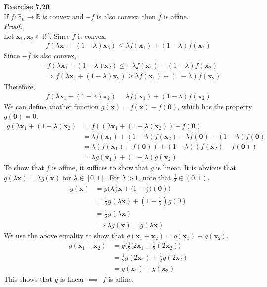 \documentclass[letterpaper,12pt]{article}
\let\vec\mathbf
\theoremstyle{definition}
\begin{document}
\textbf{Exercise 7.20} \\
If $f: \mathbb{R}_n \to \mathbb{R}$ is convex and $-f$ is also convex, then $f$ is affine.\\
\textit{Proof:} \\
Let $\vec{x}_1, \vec{x}_2 \in \mathbb{R}^n$.
Since $f$ is convex,
\begin{align*}
  f(\lambda \vec{x}_1 + (1-\lambda)\vec{x}_2) \leq \lambda f(\vec{x}_1) + (1-\lambda)f(\vec{x}_2)
\end{align*}
Since $-f$ is also convex,
\begin{align*}
  &-f(\lambda \vec{x}_1 + (1-\lambda)\vec{x}_2) \leq -\lambda f(\vec{x}_1) - (1-\lambda)f(\vec{x}_2)
  \\
  &\implies f(\lambda \vec{x}_1 + (1-\lambda)\vec{x}_2) \geq \lambda f(\vec{x}_1) + (1-\lambda)f(\vec{x}_2)
\end{align*}
Therefore,
\begin{align*}
  f(\lambda \vec{x}_1 + (1-\lambda)\vec{x}_2) = \lambda f(\vec{x}_1) + (1-\lambda)f(\vec{x}_2)
\end{align*}
We can define another function $g(\vec{x}) = f(\vec{x}) - f(\vec{0})$, which has the property $g(\vec{0})=0$.
\begin{align*}
  g(\lambda \vec{x}_1 + (1-\lambda)\vec{x}_2) &= f((\lambda \vec{x}_1 + (1-\lambda)\vec{x}_2)) - f(\vec{0})
  \\
  &= \lambda f(\vec{x}_1) + (1-\lambda)f(\vec{x}_2) - \lambda f(\vec{0}) - (1 - \lambda) f(\vec{0})
  \\
  &= \lambda (f(\vec{x}_1) - f(\vec{0})) + (1-\lambda)(f(\vec{x}_2) - f(\vec{0}))
  \\
  &= \lambda g(\vec{x}_1) + (1-\lambda)g(\vec{x}_2)
\end{align*}
To show that $f$ is affine, it suffices to show that $g$ is linear. It is obvious that $g(\lambda \vec{x}) = \lambda g(\vec{x})$ for $\lambda \in [0, 1]$. For $\lambda > 1$, note that $\frac{1}{\lambda} \in (0, 1)$.
\begin{align*}
  g(\vec{x})
  &= g\Big(\lambda \frac{1}{\lambda} \vec{x} + \Big(1-\frac{1}{\lambda}\Big)(\vec{0})\Big)
  \\
  &= \frac{1}{\lambda} g(\lambda \vec{x}) + (1-\frac{1}{\lambda})g(\vec{0})
  \\
  &= \frac{1}{\lambda} g(\lambda \vec{x})
\end{align*}
\begin{align*}
  \implies \lambda g(\vec{x}) = g(\lambda \vec{x})
\end{align*}
We use the above equality to show that $g(\vec{x}_1 + \vec{x}_2) = g(\vec{x}_1) + g(\vec{x}_2)$.
\begin{align*}
  g(\vec{x}_1 + \vec{x}_2)
  &= g\Big(\frac{1}{2}(2\vec{x}_1 + \frac{1}{2}(2\vec{x}_2)\Big) \\
  &= \frac{1}{2}g(2\vec{x}_1) + \frac{1}{2}g(2\vec{x}_2) \\
  &= g(\vec{x}_1) + g(\vec{x}_2)
\end{align*}
This shows that $g$ is linear $\implies$ $f$ is affine. \\
\end{document}
